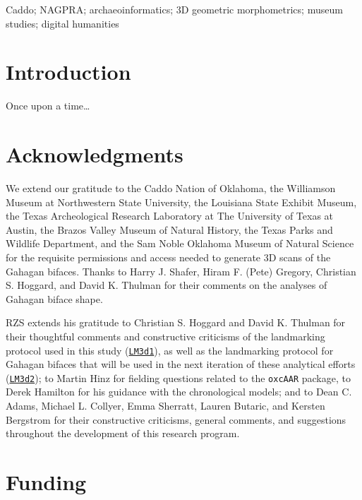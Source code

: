 \documentclass[]{interact}
\theoremstyle{plain}%
\theoremstyle{definition}
\theoremstyle{remark}
\begin{document}
\begin{keywords}
Caddo; NAGPRA; archaeoinformatics; 3D geometric morphometrics; museum
studies; digital humanities
\end{keywords}

\hypertarget{introduction}{%
\section{Introduction}\label{introduction}}

Once upon a time\ldots{}

\hypertarget{acknowledgments}{%
\section*{Acknowledgments}\label{acknowledgments}}

We extend our gratitude to the Caddo Nation of Oklahoma, the Williamson
Museum at Northwestern State University, the Louisiana State Exhibit
Museum, the Texas Archeological Research Laboratory at The University of
Texas at Austin, the Brazos Valley Museum of Natural History, the Texas
Parks and Wildlife Department, and the Sam Noble Oklahoma Museum of
Natural Science for the requisite permissions and access needed to
generate 3D scans of the Gahagan bifaces. Thanks to Harry J. Shafer,
Hiram F. (Pete) Gregory, Christian S. Hoggard, and David K. Thulman for
their comments on the analyses of Gahagan biface shape.

RZS extends his gratitude to Christian S. Hoggard and David K. Thulman
for their thoughtful comments and constructive criticisms of the
landmarking protocol used in this study
(\href{https://github.com/aksel-blaise/gahaganmorph2/blob/master/analysis/landmarking-protocol.md}{\texttt{LM3d1}}),
as well as the landmarking protocol for Gahagan bifaces that will be
used in the next iteration of these analytical efforts
(\href{https://seldenlab.github.io/gahaganmorph.3/landmarking-protocol-3d2.html}{\texttt{LM3d2}});
to Martin Hinz for fielding questions related to the \texttt{oxcAAR}
package, to Derek Hamilton for his guidance with the chronological
models; and to Dean C. Adams, Michael L. Collyer, Emma Sherratt, Lauren
Butaric, and Kersten Bergstrom for their constructive criticisms,
general comments, and suggestions throughout the development of this
research program.

\hypertarget{funding}{%
\section*{Funding}\label{funding}}
\end{document}
